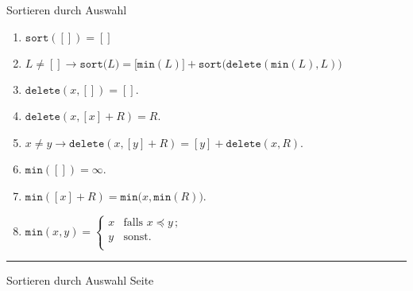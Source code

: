 \documentclass{slides}
\newcounter{mypage}
\begin{document}
\begin{slide}{}
\normalsize

\begin{center}
Sortieren durch Auswahl
\end{center}
\vspace*{0.5cm}

\footnotesize
\begin{enumerate}
\item $\mathtt{sort}([]) = []$
\item $L \not= [] \rightarrow \mathtt{sort}\bigl(L\bigr) = \bigl[\texttt{min}(L)\bigr]
      + \mathtt{sort}\bigl(\mathtt{delete}(\texttt{min}(L), L)\bigr)$
\item $\mathtt{delete}(x, []) = []$.
\item $\mathtt{delete}(x, [x] + R) = R$.
\item $x \not = y \rightarrow \mathtt{delete}(x, [y] + R) = [y] + \mathtt{delete}(x,R)$.
\item $\mathtt{min}([]) = \infty$.
\item $\mathtt{min}([x] + R) = \mathtt{min}\bigl(x, \mathtt{min}(R) \bigr)$. 
\item $\mathtt{min}(x,y) = \left\{
      \begin{array}{ll}
        x  & \mbox{falls $x \preceq y\,$;} \\
        y  & \mbox{sonst.} \\
      \end{array}\right.
      $
\end{enumerate}

\vspace*{\fill}
\tiny \addtocounter{mypage}{1}
\rule{17cm}{1mm}
Sortieren durch Auswahl \hspace*{\fill} Seite 
\end{slide}

\end{document}
